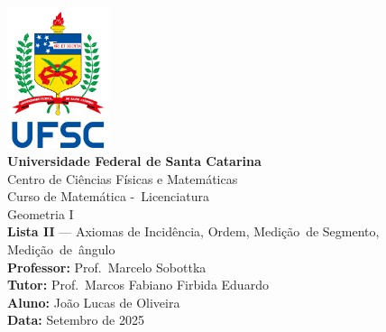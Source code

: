 \documentclass[12pt,a4paper]{article}
\newcommand{\universidade}{Universidade Federal de Santa Catarina}%
\newcommand{\centro}{Centro de Ciências Físicas e Matemáticas}
\newcommand{\curso}{Curso de Matemática -\ Licenciatura}
\newcommand{\disciplina}{Geometria I}
\newcommand{\professor}{Prof.\ Marcelo Sobottka}
\newcommand{\tutor}{Prof.\ Marcos Fabiano Firbida Eduardo}
\newcommand{\autor}{João Lucas de Oliveira}
\newcommand{\dataentrega}{Setembro de 2025}
\begin{document}
\begin{center}
    \includegraphics[width=3cm]{ufsc_logo}\\[0.3cm]
    \textbf{\universidade}\\
    \centro\\
    \curso\\[1cm]
    \disciplina{}\\
    \textbf{Lista II} --- Axiomas de Incid\^encia, Ordem, Medi\c{c}\~ao\ de Segmento, Medi\c{c}\~ao\ de\ \^angulo\\[0.5cm]
    \textbf{Professor:} \professor{}\\
    \textbf{Tutor:} \tutor{}\\
    \textbf{Aluno:} \autor{}\\
    \textbf{Data:} \dataentrega{}
\end{center}

\vspace{1cm}
\end{document}
